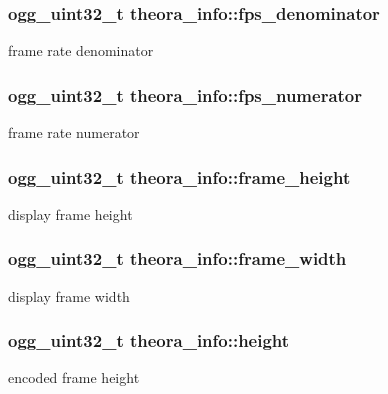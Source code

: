 \subsubsection[{fps\_\-denominator}]{\setlength{\rightskip}{0pt plus 5cm}ogg\_\-uint32\_\-t {\bf theora\_\-info::fps\_\-denominator}}\label{structtheora__info_a9aa7e826e0323a4ae8cd8646a6cfbfea}


frame rate denominator 
\subsubsection[{fps\_\-numerator}]{\setlength{\rightskip}{0pt plus 5cm}ogg\_\-uint32\_\-t {\bf theora\_\-info::fps\_\-numerator}}\label{structtheora__info_a3478199aa5ab213816c1819f70085ad7}


frame rate numerator 
\subsubsection[{frame\_\-height}]{\setlength{\rightskip}{0pt plus 5cm}ogg\_\-uint32\_\-t {\bf theora\_\-info::frame\_\-height}}\label{structtheora__info_a287e4c194f1d2e6deb39d59f1748ea48}


display frame height 
\subsubsection[{frame\_\-width}]{\setlength{\rightskip}{0pt plus 5cm}ogg\_\-uint32\_\-t {\bf theora\_\-info::frame\_\-width}}\label{structtheora__info_a8f28f4018a25634d40e4ae861fbbccfa}


display frame width 
\subsubsection[{height}]{\setlength{\rightskip}{0pt plus 5cm}ogg\_\-uint32\_\-t {\bf theora\_\-info::height}}\label{structtheora__info_ae6f0274fc4a7f285c422d91abb35f9c6}


encoded frame height 
